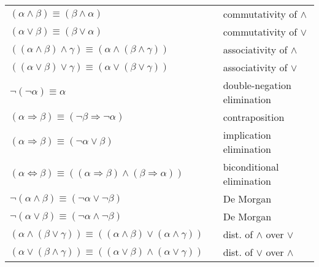 ﻿\documentclass[10pt]{article}
\begin{document}
\begin{multicols*}{2}
\scriptsize
\setlength{\tabcolsep}{10pt}
\renewcommand{\arraystretch}{1.2}
\begin{tabular}{ll l}
$(\alpha \wedge \beta) \equiv (\beta \wedge \alpha)$ & & commutativity of $\wedge$ \\
$(\alpha \vee \beta) \equiv (\beta \vee \alpha)$ & & commutativity of $\vee$ \\
$((\alpha \wedge \beta) \wedge \gamma) \equiv (\alpha \wedge (\beta \wedge \gamma))$ & & associativity of $\wedge$ \\
$((\alpha \vee \beta) \vee \gamma) \equiv (\alpha \vee (\beta \vee \gamma))$ & & associativity of $\vee$ \\
$\neg(\neg \alpha) \equiv \alpha$ & & double-negation elimination \\
$(\alpha \Rightarrow \beta) \equiv (\neg \beta \Rightarrow \neg \alpha)$ & & contraposition \\
$(\alpha \Rightarrow \beta) \equiv (\neg \alpha \vee \beta)$ & & implication elimination \\
$(\alpha \Leftrightarrow \beta) \equiv ((\alpha \Rightarrow \beta)\wedge(\beta \Rightarrow \alpha))$ & & biconditional elimination \\
$\neg(\alpha \wedge \beta) \equiv (\neg \alpha \vee \neg \beta)$ & & De Morgan \\
$\neg(\alpha \vee \beta) \equiv (\neg \alpha \wedge \neg \beta)$ & & De Morgan \\
$(\alpha \wedge (\beta \vee \gamma)) \equiv ((\alpha \wedge \beta)\vee(\alpha \wedge \gamma))$ & & dist. of $\wedge$ over $\vee$ \\
$(\alpha \vee (\beta \wedge \gamma)) \equiv ((\alpha \vee \beta)\wedge(\alpha \vee \gamma))$ & & dist. of $\vee$ over $\wedge$ \\
\end{tabular}


\end{multicols*}
\end{document}
